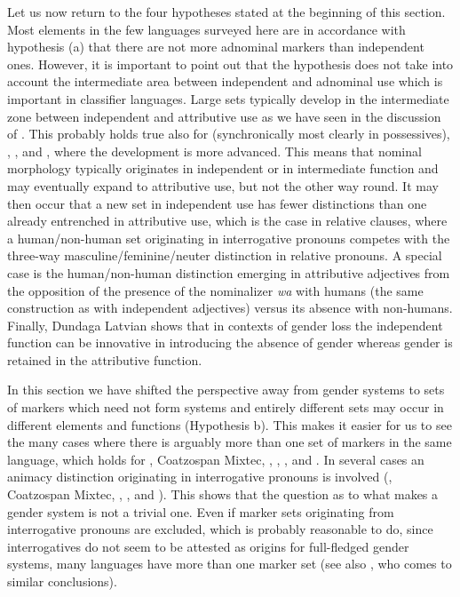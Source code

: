 \documentclass[output=collectionpaper]{langsci/langscibook}
\begin{document}
Let us now return to the four hypotheses stated at the beginning of this section. Most elements in the few languages surveyed here are in accordance with hypothesis (a) that there are not more adnominal markers than independent ones. However, it is important to point out that the hypothesis does not take into account the intermediate area between independent and adnominal use which is important in classifier languages. Large sets typically develop in the intermediate zone between independent and attributive use as we have seen in the discussion of . This probably holds true also for  (synchronically most clearly in possessives), , , and , where the development is more advanced. This means that nominal morphology typically originates in independent or in intermediate function and may eventually expand to attributive use, but not the other way round. It may then occur that a new set in independent use has fewer distinctions than one already entrenched in attributive use, which is the case in  relative clauses, where a human/non-human set originating in interrogative pronouns competes with the three-way masculine/feminine/neuter distinction in relative pronouns. A special case is the  human/non-human distinction emerging in attributive adjectives from the opposition of the presence of the nominalizer \textit{wa} with humans (the same construction as with independent adjectives) versus its absence with non-humans. Finally, Dundaga Latvian shows that in contexts of gender loss the independent function can be innovative in introducing the absence of gender whereas gender is retained in the attributive function.

In this section we have shifted the perspective away from gender systems to sets of markers which need not form systems and entirely different sets may occur in different elements and functions (Hypothesis b). This makes it easier for us to see the many cases where there is arguably more than one set of markers in the same language, which holds for , Coatzospan Mixtec, , , , and . In several cases an animacy distinction originating in interrogative pronouns is involved (, Coatzospan Mixtec, , , and ). This shows that the question as to what makes a gender system is not a trivial one. Even if marker sets originating from interrogative pronouns are excluded, which is probably reasonable to do, since interrogatives do not seem to be attested as origins for full-fledged gender systems, many languages have more than one marker set (see also \citealt{Dahl2000}, who comes to similar conclusions).
\end{document}
